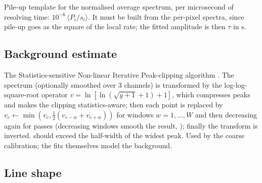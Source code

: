 Pile-up template for the normalised average spectrum, per microsecond of resolving time:
$10^{-6}\,\langle P_i/s_i\rangle$. It must be built from the per-pixel spectra, since pile-up
goes as the square of the local rate; the fitted amplitude is then $\tau$ in \textmu s.

\subsection{Background estimate}

The Statistics-sensitive Non-linear Iterative Peak-clipping algorithm \citep{Ryan1988}. The
spectrum (optionally smoothed over 3 channels) is transformed by the log-log-square-root
operator $v = \ln[\ln(\sqrt{y+1}+1)+1]$, which compresses peaks and makes the clipping
statistics-aware; then each point is replaced by
$v_c \leftarrow \min\!\left(v_c, \tfrac12(v_{c-w}+v_{c+w})\right)$ for windows $w = 1,\dots,
W$ and then decreasing again for  passes (decreasing windows smooth the result,
\citealp{Morhac1997}); finally the transform is inverted.  should exceed the
half-width of the widest peak. Used by the coarse calibration; the fits themselves model
the background.

\subsection{Line shape}

